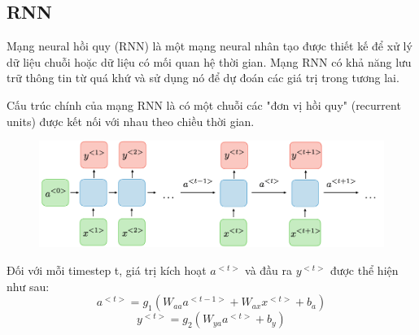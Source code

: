 \documentclass[conference]{IEEEtran}
\begin{document}
\subsection{RNN}
Mạng neural hồi quy (RNN) là một mạng neural nhân tạo được thiết kế để xử lý dữ liệu chuỗi hoặc dữ liệu có mối quan hệ thời gian. Mạng RNN có khả năng lưu trữ thông tin từ quá khứ và sử dụng nó để dự đoán các giá trị trong tương lai.

Cấu trúc chính của mạng RNN là có một chuỗi các "đơn vị hồi quy" (recurrent units) được kết nối với nhau theo chiều thời gian.\\
\begin{figure}[H]
    \centering
    \begin{minipage}{0.5\textwidth}
    \centering
    \includegraphics[width=1\textwidth]{Image/RNN1.png}
    \label{fig:1}
    \end{minipage}
\end{figure}

Đối với mỗi timestep t, giá trị kích hoạt \(a^{<t>}\) và đầu ra \(y^{<t>}\) được thể hiện như sau:
\[a^{<t>} = g_1(W_{aa}a^{<t-1>} + W_{ax}x^{<t>} + b_a)\]
\[y^{<t>} = g_2(W_{ya}a^{<t>} + b_y)\]
\end{document}

